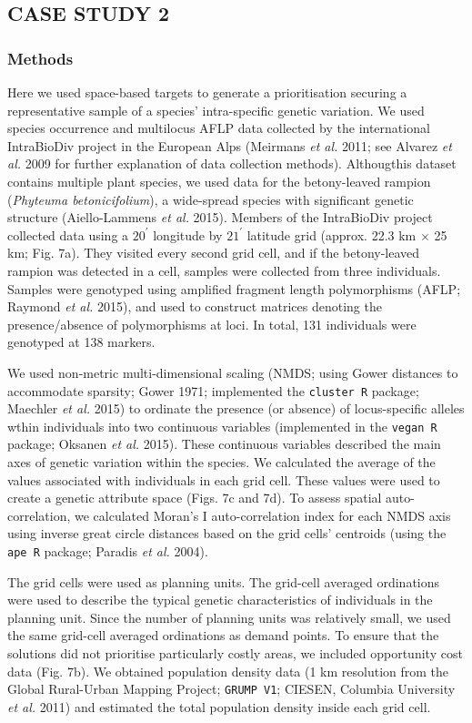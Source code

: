 \documentclass[11pt,]{article}
\begin{document}
\subsection{CASE STUDY 2}\label{case-study-2}

\subsubsection{Methods}\label{methods-3}

Here we used space-based targets to generate a prioritisation securing a
representative sample of a species' intra-specific genetic variation. We
used species occurrence and multilocus AFLP data collected by the
international IntraBioDiv project in the European Alps (Meirmans
\emph{et al.} 2011; see Alvarez \emph{et al.} 2009 for further
explanation of data collection methods). Althougthis dataset contains
multiple plant species, we used data for the betony-leaved rampion
(\textit{Phyteuma betonicifolium}), a wide-spread species with
significant genetic structure (Aiello-Lammens \emph{et al.} 2015).
Members of the IntraBioDiv project collected data using a $20^{\prime}$
longitude by $21^{\prime}$ latitude grid (approx. 22.3 km $\times$ 25
km; Fig. 7a). They visited every second grid cell, and if the
betony-leaved rampion was detected in a cell, samples were collected
from three individuals. Samples were genotyped using amplified fragment
length polymorphisms (AFLP; Raymond \emph{et al.} 2015), and used to
construct matrices denoting the presence/absence of polymorphisms at
loci. In total, 131 individuals were genotyped at 138 markers.

We used non-metric multi-dimensional scaling (NMDS; using Gower
distances to accommodate sparsity; Gower 1971; implemented the
\texttt{cluster R} package; Maechler \emph{et al.} 2015) to ordinate the
presence (or absence) of locus-specific alleles wthin individuals into
two continuous variables (implemented in the \texttt{vegan R} package;
Oksanen \emph{et al.} 2015). These continuous variables described the
main axes of genetic variation within the species. We calculated the
average of the values associated with individuals in each grid cell.
These values were used to create a genetic attribute space (Figs. 7c and
7d). To assess spatial auto-correlation, we calculated Moran's I
auto-correlation index for each NMDS axis using inverse great circle
distances based on the grid cells' centroids (using the \texttt{ape R}
package; Paradis \emph{et al.} 2004).

The grid cells were used as planning units. The grid-cell averaged
ordinations were used to describe the typical genetic characteristics of
individuals in the planning unit. Since the number of planning units was
relatively small, we used the same grid-cell averaged ordinations as
demand points. To ensure that the solutions did not prioritise
particularly costly areas, we included opportunity cost data (Fig. 7b).
We obtained population density data (1 km resolution from the Global
Rural-Urban Mapping Project; \texttt{GRUMP V1}; CIESEN, Columbia
University \emph{et al.} 2011) and estimated the total population
density inside each grid cell.
\end{document}
